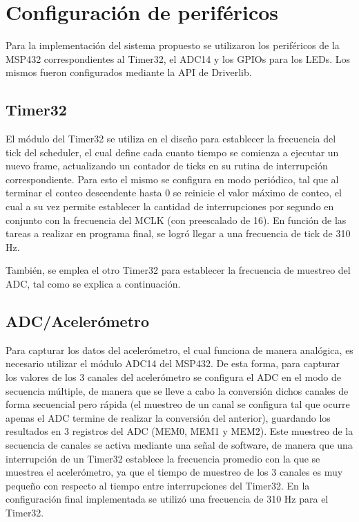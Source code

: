 \section{Configuración de periféricos}
Para la implementación del sistema propuesto se utilizaron los periféricos de la
MSP432 correspondientes al Timer32, el ADC14 y los GPIOs para los LEDs. Los
mismos fueron configurados mediante la API de Driverlib.
\subsection{Timer32}
El módulo del Timer32 se utiliza en el diseño para establecer la frecuencia del
tick del scheduler, el cual define cada cuanto tiempo se comienza a ejecutar un
nuevo frame, actualizando un contador de ticks en su rutina de interrupción
correspondiente. Para esto el mismo se configura en modo periódico, tal que al
terminar el conteo descendente hasta 0 se reinicie el valor máximo de conteo, el
cual a su vez permite establecer la cantidad de interrupciones por segundo en
conjunto con la frecuencia del MCLK (con preescalado de 16). En función de las
tareas a realizar en programa final, se logró llegar a una frecuencia de tick de
310 Hz.

También, se emplea el otro Timer32 para establecer la frecuencia de muestreo del
ADC, tal como se explica a continuación.

\subsection{ADC/Acelerómetro}
Para capturar los datos del acelerómetro, el cual funciona de manera analógica,
es necesario utilizar el módulo ADC14 del MSP432. De esta forma, para capturar
los valores de los 3 canales del acelerómetro se configura el ADC en el modo de
secuencia múltiple, de manera que se lleve a cabo la conversión dichos canales
de forma secuencial pero rápida (el muestreo de un canal se configura tal que
ocurre apenas el ADC termine de realizar la conversión del anterior), guardando
los resultados en 3 registros del ADC (MEM0, MEM1 y MEM2). Este muestreo de la
secuencia de canales se activa mediante una señal de software, de manera que una
interrupción de un Timer32 establece la frecuencia promedio con la que se
muestrea el acelerómetro, ya que el tiempo de muestreo de los 3 canales es muy
pequeño con respecto al tiempo entre interrupciones del Timer32. En la
configuración final implementada se utilizó una frecuencia de 310 Hz para el
Timer32.

